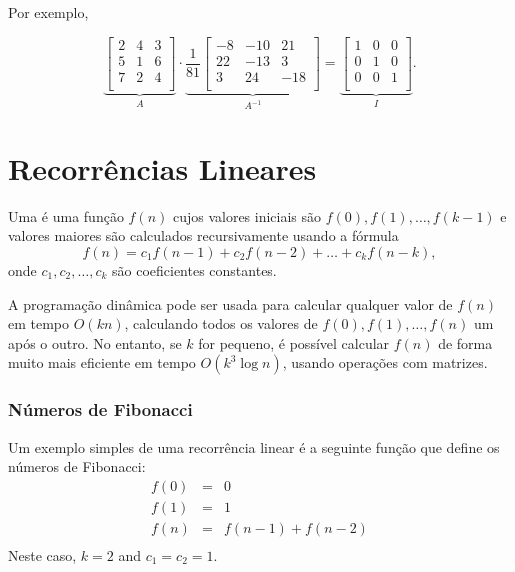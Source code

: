 Por exemplo,

\[
\underbrace{
 \begin{bmatrix}
  2 & 4 & 3\\
  5 & 1 & 6\\
  7 & 2 & 4\\
 \end{bmatrix}
}_{A}
\cdot
\underbrace{
 \frac{1}{81}
 \begin{bmatrix}
   -8 & -10 & 21 \\
   22 & -13 & 3 \\
   3 & 24 & -18 \\
 \end{bmatrix}
}_{A^{-1}}
=
\underbrace{
 \begin{bmatrix}
  1 & 0 & 0 \\
  0 & 1 & 0 \\
  0 & 0 & 1 \\
 \end{bmatrix}
}_{I}.
\]

\section{Recorrências Lineares}


Uma 
é uma função $f(n)$
cujos valores iniciais são
$f(0),f(1),\ldots,f(k-1)$
e valores maiores
são calculados recursivamente usando a fórmula
\[f(n) = c_1 f(n-1) + c_2 f(n-2) + \ldots + c_k f (n-k),\]
onde $c_1,c_2,\ldots,c_k$ são coeficientes constantes.

A programação dinâmica pode ser usada para calcular
qualquer valor de $f(n)$ em tempo $O(kn)$, calculando
todos os valores de $f(0),f(1),\ldots,f(n)$ um após o outro.
No entanto, se $k$ for pequeno, é possível calcular
$f(n)$ de forma muito mais eficiente em tempo $O(k^3 \log n)$,
usando operações com matrizes.

\subsubsection{Números de Fibonacci}


Um exemplo simples de uma recorrência linear é a
seguinte função que define os números de Fibonacci:
\[
\begin{array}{lcl}
f(0) & = & 0 \\
f(1) & = & 1 \\
f(n) & = & f(n-1)+f(n-2) \\
\end{array}
\]
Neste caso, $k=2$ and $c_1=c_2=1$.

